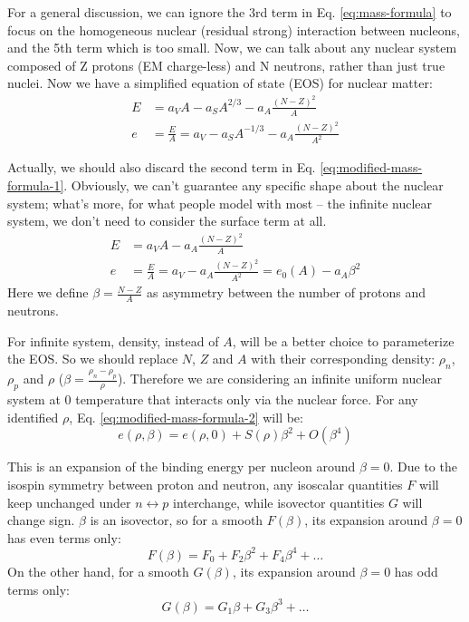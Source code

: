 For a general discussion, we can ignore the 3rd term in Eq. \ref{eq:mass-formula}
to focus on the homogeneous nuclear (residual strong) interaction between nucleons, 
and the 5th term which is too small.
Now, we can talk about any nuclear system composed of Z protons (EM charge-less) 
and N neutrons, rather than just true nuclei. Now we have a simplified equation
of state (EOS) for nuclear matter:
\begin{equation}
    \begin{aligned}
	E &= a_V A - a_S A^{2/3} - a_A\frac{(N-Z)^2}{A}  \\
	e &= \frac{E}{A} = a_V - a_S A^{-1/3} - a_A\frac{(N-Z)^2}{A^2}
    \end{aligned}
    \label{eq:modified-mass-formula-1}
\end{equation}

Actually, we should also discard the second term in Eq. \ref{eq:modified-mass-formula-1}. 
Obviously, we can't guarantee
any specific shape about the nuclear system; what's more, for what people model
with most -- the infinite nuclear system, we don't need to consider the surface 
term at all.
\begin{equation}
    \begin{aligned}
	E &= a_V A - a_A\frac{(N-Z)^2}{A}  \\
	e &= \frac{E}{A} = a_V - a_A\frac{(N-Z)^2}{A^2} = e_0(A) - a_A\beta^2 
    \end{aligned}
    \label{eq:modified-mass-formula-2}
\end{equation}
Here we define $\beta = \frac{N-Z}{A}$ as asymmetry between the number of protons and neutrons. 

For infinite system, density, instead of $A$, will be a better choice to parameterize
the EOS. So we should replace $N$, $Z$ and $A$ with their corresponding density: $\rho_n$, 
$\rho_p$ and $\rho$ ($\beta = \frac{\rho_n - \rho_p}{\rho}$). 
Therefore we are considering an infinite uniform nuclear system at 0 temperature that interacts
only via the nuclear force. For any identified $\rho$,
Eq. \ref{eq:modified-mass-formula-2} will be:
\begin{equation}
    e(\rho, \beta) = e(\rho, 0) + S(\rho)\beta^2 + O(\beta^4)
    \label{eq:symmetry-energy}
\end{equation}

This is an expansion of the binding energy per nucleon around $\beta = 0$.
Due to the isospin symmetry between proton and neutron, any isoscalar quantities
$F$ will keep unchanged under $n \leftrightarrow p$ interchange, while isovector 
quantities $G$ will change sign. $\beta$ is an isovector, so for a smooth $F(\beta)$,
its expansion around $\beta = 0$ has even terms only:
$$ F(\beta) = F_0 + F_2\beta^2 + F_4\beta^4 + \dots $$
On the other hand, for a smooth $G(\beta)$, its expansion around $\beta = 0$ has
odd terms only:
$$ G(\beta) = G_1\beta + G_3\beta^3 + \dots $$

